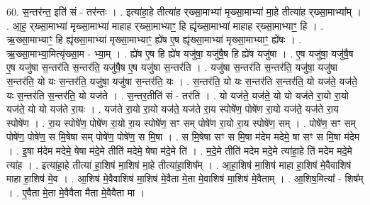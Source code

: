 \documentclass[17pt]{extarticle}
\begin{document}
60. स॒न्तर॑न्त॒ इति॑ सं - तर॑न्तः । . इत्या॑हा॒हे तीत्या॑ह र्‌ख्सा॒माभ्या॑ मृख्सा॒माभ्या॑ मा॒हे तीत्या॑ह र्‌ख्सा॒माभ्या᳚म् । . आ॒ह॒ र्‌ख्सा॒माभ्या॑ मृख्सा॒माभ्या॑ माहाह र्‌ख्सा॒माभ्याꣳ॒॒ हि ह्यृ॑ख्सा॒माभ्या॑ माहाह र्‌ख्सा॒माभ्याꣳ॒॒ हि । . ऋ॒ख्सा॒माभ्याꣳ॒॒ हि ह्यृ॑ख्सा॒माभ्या॑ मृख्सा॒माभ्याꣳ॒॒ ह्ये॑ष ए॒ष ह्यृ॑ख्सा॒माभ्या॑ मृख्सा॒माभ्याꣳ॒॒ ह्ये॑षः । . ऋ॒ख्सा॒माभ्या॒मित्यृ॑ख्सा॒म - भ्या॒म् । . ह्ये॑ष ए॒ष हि ह्ये॑ष यजु॑षा॒ यजु॑षै॒ष हि ह्ये॑ष यजु॑षा । . ए॒ष यजु॑षा॒ यजु॑षै॒ष ए॒ष यजु॑षा स॒न्तर॑ति स॒न्तर॑ति॒ यजु॑षै॒ष ए॒ष यजु॑षा स॒न्तर॑ति । . यजु॑षा स॒न्तर॑ति स॒न्तर॑ति॒ यजु॑षा॒ यजु॑षा स॒न्तर॑ति॒ यो यः स॒न्तर॑ति॒ यजु॑षा॒ यजु॑षा स॒न्तर॑ति॒ यः । . स॒न्तर॑ति॒ यो यः स॒न्तर॑ति स॒न्तर॑ति॒ यो यज॑ते॒ यज॑ते॒ यः स॒न्तर॑ति स॒न्तर॑ति॒ यो यज॑ते । . स॒न्तर॒तीति॑ सं - तर॑ति । . यो यज॑ते॒ यज॑ते॒ यो यो यज॑ते रा॒यो रा॒यो यज॑ते॒ यो यो यज॑ते रा॒यः । . यज॑ते रा॒यो रा॒यो यज॑ते॒ यज॑ते रा॒य स्पोषे॑ण॒ पोषे॑ण रा॒यो यज॑ते॒ यज॑ते रा॒य स्पोषे॑ण । . रा॒य स्पोषे॑ण॒ पोषे॑ण रा॒यो रा॒य स्पोषे॑ण॒ सꣳ सम् पोषे॑ण रा॒यो रा॒य स्पोषे॑ण॒ सम् । . पोषे॑ण॒ सꣳ सम् पोषे॑ण॒ पोषे॑ण॒ स मि॒षेषा सम् पोषे॑ण॒ पोषे॑ण॒ स मि॒षा । . स मि॒षेषा सꣳ स मि॒षा म॑देम मदेमे॒ षा सꣳ स मि॒षा म॑देम । . इ॒षा म॑देम मदेमे॒ षेषा म॑दे॒मे तीति॑ मदेमे॒ षेषा म॑दे॒मे ति॑ । . म॒दे॒मे तीति॑ मदेम मदे॒मे त्या॑हा॒हे ति॑ मदेम मदे॒मे त्या॑ह । . इत्या॑हा॒हे तीत्या॑ हा॒शिष॑ मा॒शिष॑ मा॒हे तीत्या॑हा॒शिष᳚म् । . आ॒हा॒शिष॑ मा॒शिष॑ माहा हा॒शिष॑ मे॒वैवाशिष॑ माहा हा॒शिष॑ मे॒व । . आ॒शिष॑ मे॒वैवाशिष॑ मा॒शिष॑ मे॒वैता मे॒ता मे॒वाशिष॑ मा॒शिष॑ मे॒वैताम् । . आ॒शिष॒मित्या᳚ - शिष᳚म् । . ए॒वैता मे॒ता मे॒वैवैता मैता मे॒वैवैता मा । \newline
\end{document}
